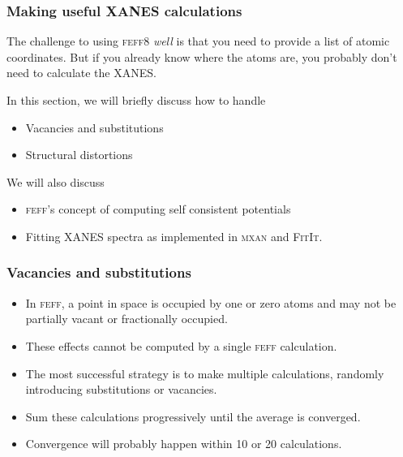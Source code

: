 
\begin{frame}
  \frametitle{Making useful XANES calculations}

  The challenge to using \textsc{feff}8 \textit{well} is that you need
  to provide a list of atomic coordinates.  But if you already know
  where the atoms are, you probably don't need to calculate the XANES.

  \bigskip

  In this section, we will briefly discuss how to handle

  \begin{itemize}
  \item Vacancies and substitutions
  \item Structural distortions
  \end{itemize}

  We will also discuss
  \begin{itemize}
  \item \textsc{feff}'s concept of computing {\color{Blue4}self
      consistent potentials}
  \item {\color{Blue4}Fitting} XANES spectra as implemented in
    \textsc{mxan} and \textsc{FitIt}.
  \end{itemize}
\end{frame}

\begin{frame}
  \frametitle{Vacancies and substitutions}
  \begin{itemize}
  \item In \textsc{feff}, a point in space is occupied by {\color{Blue4}one
      or zero} atoms and may not be partially vacant or fractionally
    occupied.
  \item These effects cannot be computed by a \alert{single}
    \textsc{feff} calculation.
  \item The most successful strategy is to make multiple calculations,
    randomly introducing substitutions or vacancies.
  \item Sum these calculations progressively until the average is
    converged.
  \item Convergence will probably happen within 10 or 20 calculations.
  \end{itemize}
\end{frame}

